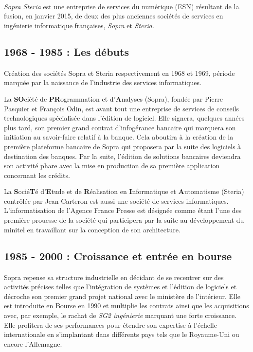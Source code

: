 \paragraph{}
\textit{Sopra Steria} est une entreprise de services du numérique (ESN) résultant de la fusion, en janvier 2015, de deux des plus anciennes sociétés de services en ingénierie informatique françaises, \textit{Sopra} et \textit{Steria}.

\subsection{1968 - 1985 : Les débuts}

\paragraph{}
Création des sociétés Sopra et Steria respectivement en 1968 et 1969, période marquée par la naissance de l'industrie des services informatiques.

La \textbf{SO}ciété de \textbf{PR}ogrammation et d'\textbf{A}nalyses (Sopra), fondée par Pierre Pasquier et François Odin, est avant tout une entreprise de services de conseils technologiques spécialisée dans l'édition de logiciel. Elle signera, quelques années plus tard, son premier grand contrat d'infogérance bancaire qui marquera son initiation au savoir-faire relatif à la banque. Cela aboutira à la création de la première plateforme bancaire de Sopra qui proposera par la suite des logiciels à destination des banques. Par la suite, l'édition de solutions bancaires deviendra son activité phare avec la mise en production de sa première application concernant les crédits.

La \textbf{S}ocié\textbf{T}é d'\textbf{E}tude et de \textbf{R}éalisation en \textbf{I}nformatique et \textbf{A}utomatisme (Steria) contrôlée par Jean Carteron est aussi une société de services informatiques. L'informatisation de l'Agence France Presse est désignée comme étant l'une des première prouesse de la société qui participera par la suite au développement du minitel en travaillant sur la conception de son architecture.

\subsection{1985 - 2000 : Croissance et entrée en bourse}

\paragraph{}
Sopra repense sa structure industrielle en décidant de se recentrer sur des activités précises telles que l'intégration de systèmes et l'édition de logiciels et décroche son premier grand projet national avec le ministère de l'intérieur. Elle est introduite en Bourse en 1990 et multiplie les contrats ainsi que les acquisitions avec, par exemple, le rachat de \textit{SG2 ingénierie} marquant une forte croissance. Elle profitera de ses performances pour étendre son expertise à l'échelle internationale en s'implantant dans différents pays tels que le Royaume-Uni ou encore l'Allemagne.\\


